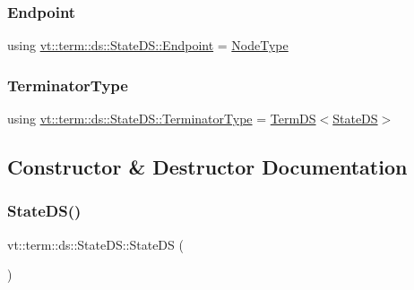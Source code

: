 \subsubsection{\texorpdfstring{Endpoint}{Endpoint}}
{\footnotesize\ttfamily using \hyperlink{structvt_1_1term_1_1ds_1_1_state_d_s_aba302de614dd639f5d93f4f5b6dd6108}{vt\+::term\+::ds\+::\+State\+D\+S\+::\+Endpoint} =  \hyperlink{namespacevt_a866da9d0efc19c0a1ce79e9e492f47e2}{Node\+Type}}

\mbox{\label{structvt_1_1term_1_1ds_1_1_state_d_s_af98cfe31c25f710273ee103026d538e4}} 
\subsubsection{\texorpdfstring{Terminator\+Type}{TerminatorType}}
{\footnotesize\ttfamily using \hyperlink{structvt_1_1term_1_1ds_1_1_state_d_s_af98cfe31c25f710273ee103026d538e4}{vt\+::term\+::ds\+::\+State\+D\+S\+::\+Terminator\+Type} =  \hyperlink{structvt_1_1term_1_1ds_1_1_term_d_s}{Term\+DS}$<$\hyperlink{structvt_1_1term_1_1ds_1_1_state_d_s}{State\+DS}$>$}



\subsection{Constructor \& Destructor Documentation}
\mbox{\label{structvt_1_1term_1_1ds_1_1_state_d_s_a8b90d70734aebbe6cbea49fa8fc713f2}} 
\subsubsection{\texorpdfstring{State\+D\+S()}{StateDS()}\hspace{0.1cm}{\footnotesize\ttfamily [1/3]}}
{\footnotesize\ttfamily vt\+::term\+::ds\+::\+State\+D\+S\+::\+State\+DS (\begin{DoxyParamCaption}{ }\end{DoxyParamCaption})\hspace{0.3cm}{\ttfamily [default]}}

